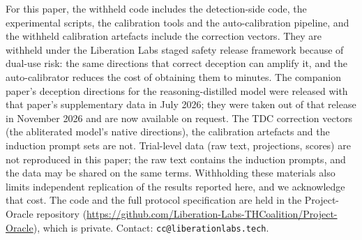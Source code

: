 \documentclass[11pt,letterpaper]{article}
\begin{document}
\medskip\noindent For this paper, the withheld code includes the detection-side code, the experimental scripts, the calibration tools and the auto-calibration pipeline, and the withheld calibration artefacts include the correction vectors. They are withheld under the Liberation Labs staged safety release framework because of dual-use risk: the same directions that correct deception can amplify it, and the auto-calibrator reduces the cost of obtaining them to minutes. The companion paper's deception directions for the reasoning-distilled model were released with that paper's supplementary data in July 2026; they were taken out of that release in November 2026 and are now available on request. The TDC correction vectors (the abliterated model's native directions), the calibration artefacts and the induction prompt sets are not. Trial-level data (raw text, projections, scores) are not reproduced in this paper; the raw text contains the induction prompts, and the data may be shared on the same terms. Withholding these materials also limits independent replication of the results reported here, and we acknowledge that cost. The code and the full protocol specification are held in the Project-Oracle repository (\url{https://github.com/Liberation-Labs-THCoalition/Project-Oracle}), which is private. Contact: \texttt{cc@liberationlabs.tech}.
\end{document}
